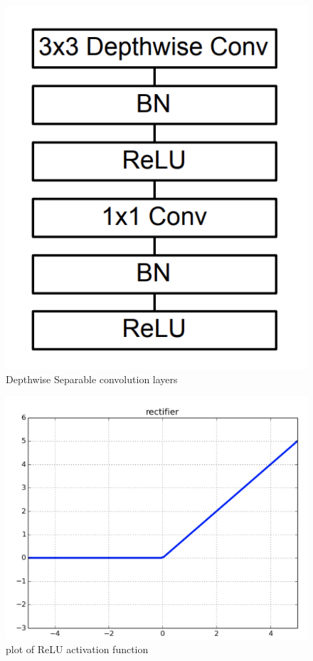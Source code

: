 \documentclass[11pt, titlepage]{article} %
\begin{document}
\begin{figure}[]
	\centering
   	\includegraphics[scale=0.5]{convolution4.png}
   	\caption{Depthwise Separable convolution layers}
   	\label{fig:convolution4}
\end{figure}

\begin{figure}[]
	\centering
   	\includegraphics[scale=0.3]{convolution5.png}
   	\caption{plot of ReLU activation function}
   	\label{fig:convolution5}
\end{figure}
\end{document}
